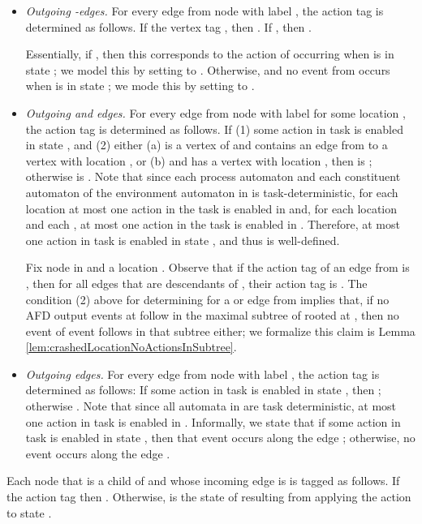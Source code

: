 \documentclass[11pt]{article}
\numberwithin{theorem}{section}
\begin{document}
\begin{itemize}
\item
\emph{Outgoing -edges.} 
For every edge  from node  with label , the action tag
 is determined as follows.
If the vertex tag , then .
If , then .

Essentially, if , then 
this corresponds to the action  of  occurring when  is in state ; we model this by setting  to . Otherwise,  and no event from  occurs  when  is in state ; we mode this by setting  to . 

\item
\emph{Outgoing  and  edges.} 
For every edge  from node  with label  for some
location , the action tag  is determined as follows.
If (1) some action  in task  is enabled in state ,  and (2) either 
(a)  is a vertex of  and  contains an edge from  to a vertex with location , or (b)  and  has a vertex with location , then
 is ; otherwise  is . 
Note that since each process automaton and each constituent automaton of the environment automaton in  is task-deterministic, for each location  at most one
action in the  task is enabled in  and, for each location  and each , at most one action in the  task is enabled in . Therefore, at most one action  in task  is enabled in state , and thus  is well-defined.

Fix node  in  and a location . Observe that if the action tag of an  edge from  is , then for all  edges that are descendants of , their action tag is . The condition (2) above for determining  for a  or  edge  from  implies that, if no AFD output events at  follow  in the maximal subtree of  rooted at , then no  event of  event follows  in that subtree either; we formalize this claim is Lemma \ref{lem:crashedLocationNoActionsInSubtree}. 



\item
\emph{Outgoing  edges.}
For every edge  from node  with label , the action tag  is determined as
follows:
If some action  in task  is enabled in state , then ; otherwise . 
Note that since all automata in  are task deterministic, at most
one action in task  is enabled in . Informally, we state that if some action in task  is enabled in state , then that event occurs along the edge ; otherwise, no event occurs along the edge .
\end{itemize}


Each node  that is a child of  and whose incoming edge is
 is tagged as follows. 
If the action tag  then . 
Otherwise,  is the state of  resulting from applying the
action  to state . 
\end{document}
